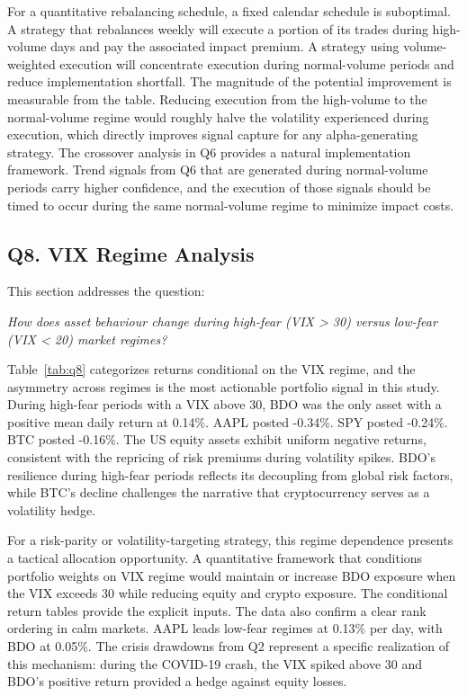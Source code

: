 For a quantitative rebalancing schedule, a fixed calendar schedule is suboptimal. A strategy that rebalances weekly will execute a portion of its trades during high-volume days and pay the associated impact premium. A strategy using volume-weighted execution will concentrate execution during normal-volume periods and reduce implementation shortfall. The magnitude of the potential improvement is measurable from the table. Reducing execution from the high-volume to the normal-volume regime would roughly halve the volatility experienced during execution, which directly improves signal capture for any alpha-generating strategy. The crossover analysis in Q6 provides a natural implementation framework. Trend signals from Q6 that are generated during normal-volume periods carry higher confidence, and the execution of those signals should be timed to occur during the same normal-volume regime to minimize impact costs.

\subsection{Q8. VIX Regime Analysis}

This section addresses the question:

\noindent\textit{How does asset behaviour change during high-fear (VIX > 30) versus low-fear (VIX < 20) market regimes?}



Table~\ref{tab:q8} categorizes returns conditional on the VIX regime, and the asymmetry across regimes is the most actionable portfolio signal in this study. During high-fear periods with a VIX above 30, BDO was the only asset with a positive mean daily return at 0.14\%. AAPL posted -0.34\%. SPY posted -0.24\%. BTC posted -0.16\%. The US equity assets exhibit uniform negative returns, consistent with the repricing of risk premiums during volatility spikes. BDO's resilience during high-fear periods reflects its decoupling from global risk factors, while BTC's decline challenges the narrative that cryptocurrency serves as a volatility hedge.

For a risk-parity or volatility-targeting strategy, this regime dependence presents a tactical allocation opportunity. A quantitative framework that conditions portfolio weights on VIX regime would maintain or increase BDO exposure when the VIX exceeds 30 while reducing equity and crypto exposure. The conditional return tables provide the explicit inputs. The data also confirm a clear rank ordering in calm markets. AAPL leads low-fear regimes at 0.13\% per day, with BDO at 0.05\%. The crisis drawdowns from Q2 represent a specific realization of this mechanism: during the COVID-19 crash, the VIX spiked above 30 and BDO's positive return provided a hedge against equity losses.

